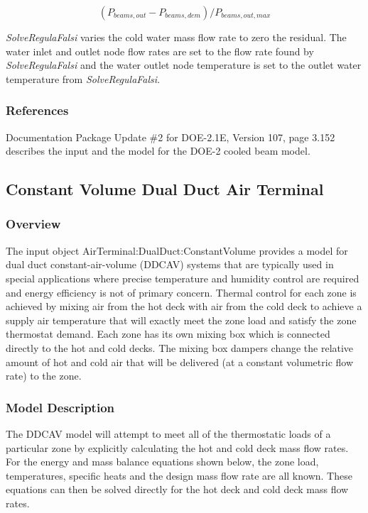 \begin{equation}
(P_{beams,out}-P_{beams,dem})/P_{beams,out,max}
\end{equation}

\emph{SolveRegulaFalsi} varies the cold water mass flow rate to zero the residual. The water inlet and outlet node flow rates are set to the flow rate found by \emph{SolveRegulaFalsi} and the water outlet node temperature is set to the outlet water temperature from \emph{SolveRegulaFalsi}.

\subsubsection{References}\label{references-4}

Documentation Package Update \#2 for DOE-2.1E, Version 107, page 3.152 describes the input and the model for the DOE-2 cooled beam model.

\subsection{Constant Volume Dual Duct Air Terminal}\label{constant-volume-dual-duct-air-terminal}

\subsubsection{Overview}\label{overview-3-000}

The input object AirTerminal:DualDuct:ConstantVolume provides a model for dual duct constant-air-volume (DDCAV) systems that are typically used in special applications where precise temperature and humidity control are required and energy efficiency is not of primary concern. Thermal control for each zone is achieved by mixing air from the hot deck with air from the cold deck to achieve a supply air temperature that will exactly meet the zone load and satisfy the zone thermostat demand. Each zone has its own mixing box which is connected directly to the hot and cold decks. The mixing box dampers change the relative amount of hot and cold air that will be delivered (at a constant volumetric flow rate) to the zone.

\subsubsection{Model Description}\label{model-description-2-000}

The DDCAV model will attempt to meet all of the thermostatic loads of a particular zone by explicitly calculating the hot and cold deck mass flow rates. For the energy and mass balance equations shown below, the zone load, temperatures, specific heats and the design mass flow rate are all known. These equations can then be solved directly for the hot deck and cold deck mass flow rates.

